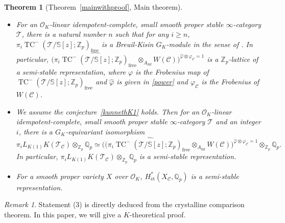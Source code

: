 \documentclass[11pt]{amsart}
\newcommand{\Q}{\mathbb{Q}}
\newcommand{\Z}{\mathbb{Z}}
\newcommand{\sO}{\mathcal{O}}
\newcommand{\sT}{\mathcal{T}}
\newcommand{\bS}{\mathbb{S}}
\newcommand{\free}{\operatorname{{free}}}
\newcommand{\LK}{{L_{K(1)}}}
\newcommand{\TCn}{\operatorname{TC}^{-}}
\newcommand{\et}{{\operatorname{\acute{e}t}}}
\newcommand{\Ainf}{A_{\operatorname{inf}}}
\newcommand{\Cu}{\mathcal{C}}
\newtheorem{thm}[lemma]{Theorem}
\theoremstyle{definition}
\theoremstyle{remark}
\newtheorem{remark}[lemma]{Remark}
\numberwithin{equation}{section}
\begin{document}
\begin{thm}[{Theorem~\ref{mainwithproof}}, Main theorem]\label{main}
\begin{itemize}
 \item[(1)] For an $\sO_K$-linear idempotent-complete, small smooth proper stable $\infty$-category $\sT$, there is a natural number $n$ such that for any $i\geq n$, $\pi_i \TCn(\sT/\bS[z];\Z_p)_{\free}$ is a Breuil-Kisin $G_K$-module in the sense of \cite{Gao}. In particular, $\bigl( \widehat{\pi_i\TCn(\sT/\bS[z];\Z_p)_{\free}}\otimes_{\Ainf} W(\Cu) \bigr)^{\widehat{\varphi}\otimes\varphi_{\Cu}=1}$ is a $\Z_p$-lattice of a semi-stable representation, where $\varphi$ is the Frobenius map of $\TCn(\sT/\bS[z];\Z_p)_{\free}$ and $\widehat{\varphi}$ is given in \eqref{power} and $\varphi_{\Cu}$ is the Frobenius of $W(\Cu)$.

  \item[(2)] We assume the conjecture~\ref{kunnethK1} holds. Then for an $\sO_K$-linear idempotent-complete, small smooth proper stable $\infty$-category $\sT$ and an integer $i$, there is a $G_K$-equivariant isomorphism
\[
\pi_i \LK K(\sT_{\Cu})\otimes_{\Z_p}\Q_p \simeq \bigl(\bigl( \widehat{\pi_i\TCn(\sT/\bS[z];\Z_p)_{\free}}\otimes_{\Ainf} W(\Cu) \bigr)^{\widehat{\varphi}\otimes \varphi_{\Cu}=1}\otimes_{\Z_p}\Q_p.
\]
In particular, $\pi_i \LK K(\sT_{\Cu})\otimes_{\Z_p}\Q_p$ is a semi-stable representation.

\item[(3)] For a smooth proper variety $X$ over $\sO_K$, $H^*_\et(X_{\Cu},\Q_p)$ is a semi-stable representation. 
\end{itemize}
\end{thm}
\begin{remark}
Statement (3) is directly deduced from the crystalline comparison theorem. In this paper, we will give a $K$-theoretical proof.
\end{remark}
\end{document}
